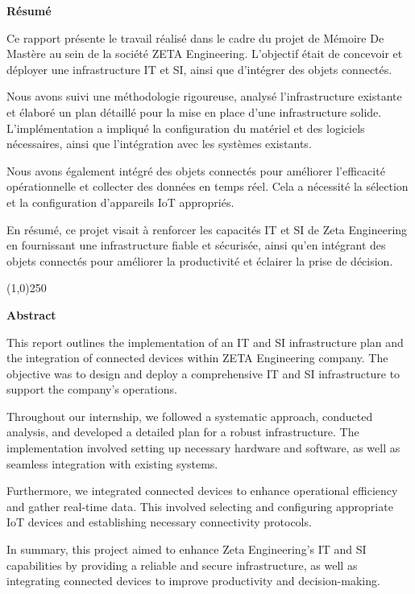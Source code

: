 \textbf{Résumé}

Ce rapport présente le travail réalisé dans le cadre du projet de Mémoire De Mastère au sein de la société ZETA Engineering. L'objectif était de concevoir et déployer une infrastructure IT et SI, ainsi que d'intégrer des objets connectés.

Nous avons suivi une méthodologie rigoureuse, analysé l'infrastructure existante et élaboré un plan détaillé pour la mise en place d'une infrastructure solide. L'implémentation a impliqué la configuration du matériel et des logiciels nécessaires, ainsi que l'intégration avec les systèmes existants.

Nous avons également intégré des objets connectés pour améliorer l'efficacité opérationnelle et collecter des données en temps réel. Cela a nécessité la sélection et la configuration d'appareils IoT appropriés.

En résumé, ce projet visait à renforcer les capacités IT et SI de Zeta Engineering en fournissant une infrastructure fiable et sécurisée, ainsi qu'en intégrant des objets connectés pour améliorer la productivité et éclairer la prise de décision.

\begin{center}
\line(1,0){250}
\end{center}

\textbf{Abstract}

This report outlines the implementation of an IT and SI infrastructure plan and the integration of connected devices within ZETA Engineering company. The objective was to design and deploy a comprehensive IT and SI infrastructure to support the company's operations.

Throughout our internship, we followed a systematic approach, conducted analysis, and developed a detailed plan for a robust infrastructure. The implementation involved setting up necessary hardware and software, as well as seamless integration with existing systems.

Furthermore, we integrated connected devices to enhance operational efficiency and gather real-time data. This involved selecting and configuring appropriate IoT devices and establishing necessary connectivity protocols.

In summary, this project aimed to enhance Zeta Engineering's IT and SI capabilities by providing a reliable and secure infrastructure, as well as integrating connected devices to improve productivity and decision-making.


